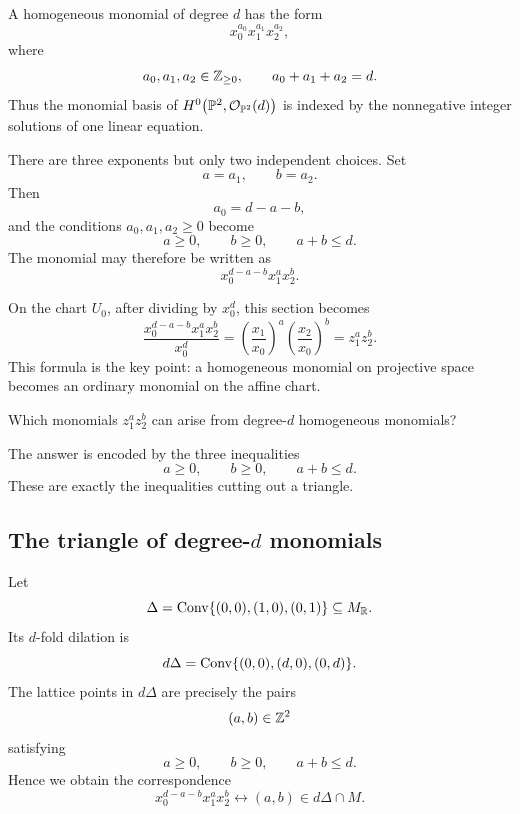 A homogeneous monomial of degree \(d\) has the form
\[
x_0^{a_0}x_1^{a_1}x_2^{a_2},
\]
where
\[
a_0,a_1,a_2\in\mathbb{Z}_{\geq0},
\qquad
a_0+a_1+a_2=d.
\]
Thus the monomial basis of
\(H^{0}\!\left(\mathbb{P}^2,\mathcal{O}_{\mathbb{P}^2}(d)\right)\) is indexed by the nonnegative
integer solutions of one linear equation.

There are three exponents but only two independent choices. Set
\[
a=a_1,
\qquad
b=a_2.
\]
Then
\[
a_0=d-a-b,
\]
and the conditions \(a_0,a_1,a_2\geq0\) become
\[
a\geq0,
\qquad
b\geq0,
\qquad
a+b\leq d.
\]
The monomial may therefore be written as
\[
x_0^{d-a-b}x_1^ax_2^b.
\]

On the chart \(U_0\), after dividing by \(x_0^d\), this section becomes
\[
\frac{x_0^{d-a-b}x_1^ax_2^b}{x_0^d}
=
\left(\frac{x_1}{x_0}\right)^a
\left(\frac{x_2}{x_0}\right)^b
=
z_1^az_2^b.
\]
This formula is the key point: a homogeneous monomial on projective
space becomes an ordinary monomial on the affine chart.

\begin{guidingquestion}
Which monomials \(z_1^az_2^b\) can arise from degree-\(d\)
homogeneous monomials?
\end{guidingquestion}

The answer is encoded by the three inequalities
\[
a\geq0,
\qquad
b\geq0,
\qquad
a+b\leq d.
\]
These are exactly the inequalities cutting out a triangle.

\subsection{The triangle of degree-\texorpdfstring{\(d\)}{d} monomials}

Let
\[
\Delta
=
\operatorname{Conv}\{(0,0),(1,0),(0,1)\}
\subseteq M_{\mathbb{R}}.
\]
Its \(d\)-fold dilation is
\[
d\Delta
=
\operatorname{Conv}\{(0,0),(d,0),(0,d)\}.
\]
The lattice points in \(d\Delta\) are precisely the pairs
\[
(a,b)\in\mathbb{Z}^2
\]
satisfying
\[
a\geq0,
\qquad
b\geq0,
\qquad
a+b\leq d.
\]
Hence we obtain the correspondence
\[
x_0^{d-a-b}x_1^ax_2^b
\longleftrightarrow
(a,b)\in d\Delta\cap M.
\]

